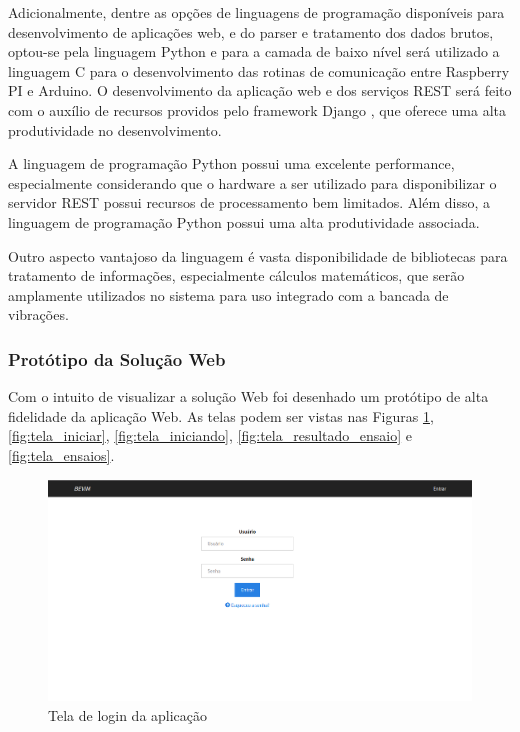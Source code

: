 Adicionalmente, dentre as opções de linguagens de programação disponíveis para desenvolvimento de aplicações web, e do parser e tratamento dos dados brutos, optou-se pela linguagem Python e para a camada de baixo nível será utilizado a linguagem C para o desenvolvimento  das rotinas de comunicação entre Raspberry PI e Arduino. O desenvolvimento da aplicação web e dos serviços REST será feito com o auxílio de recursos providos pelo framework Django \footnotemark, que oferece uma alta produtividade no desenvolvimento.

A linguagem de programação Python possui uma excelente performance, especialmente considerando que o hardware a ser utilizado para disponibilizar o servidor REST possui recursos de processamento bem limitados. Além disso, a linguagem de programação Python possui uma alta produtividade associada.

Outro aspecto vantajoso da linguagem é vasta disponibilidade de bibliotecas para tratamento de informações, especialmente cálculos matemáticos, que serão amplamente utilizados no sistema para uso integrado com a bancada de vibrações.

\subsubsection*{\textbf{Protótipo da Solução Web}}

Com o intuito de visualizar a solução Web foi desenhado um protótipo de alta fidelidade da aplicação Web. As telas podem ser vistas nas Figuras \ref{fig:tela_login}, \ref{fig:tela_iniciar}, \ref{fig:tela_iniciando}, \ref{fig:tela_resultado_ensaio} e \ref{fig:tela_ensaios}.


\begin{figure}[!h]    
\centering
\label{fig:tela_login}	
\includegraphics[keepaspectratio=true,scale=0.55]	{figuras/tela_login.png}
\caption{Tela de login da aplicação}
\end{figure}  

